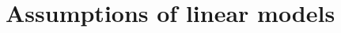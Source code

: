 \documentclass[]{book}\usepackage[]{graphicx}\usepackage[]{color}
\begin{document}
% 
% 

\chapter{Assumptions of linear models}\label{chap:assumptions}
\end{document}

